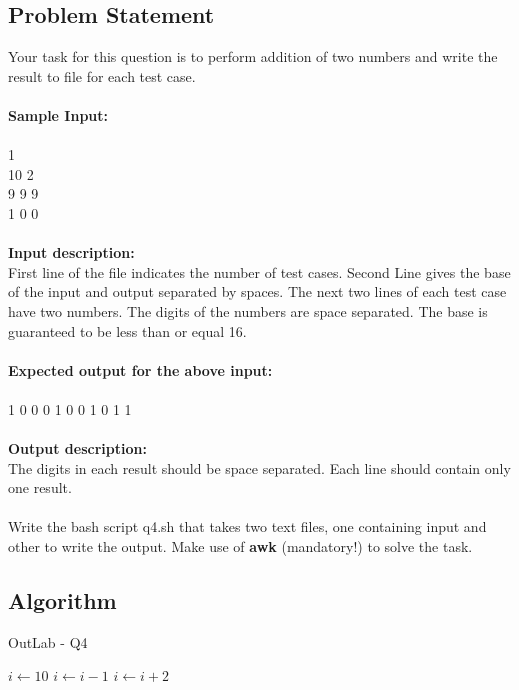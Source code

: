 \documentclass[12pt]{article}
\begin{document}
\subsection{Problem Statement}
Your task for this question is to perform addition of two numbers and 
write the result to file for each test case.\\\\
\textbf{Sample Input:}\\\\
1
\\
10 2
\\
9 9 9
\\
1 0 0
\\
\\
\textbf{Input description:}
\\
First line of the file indicates the number of test cases.
Second Line gives the base of the input and output separated by spaces. 
The next two lines of each test case have two numbers. 
The digits of the numbers are space separated. 
The base is guaranteed to be less than or equal 16.
\\\\
\textbf{Expected output for the above input:}
\\\\
1 0 0 0 1 0 0 1 0 1 1
\\\\
\textbf{Output description:}
\\
The digits in each result should be space separated. 
Each line should contain only one result.\\\\
Write the bash script q4.sh that takes two text files, one containing input and 
other to write the output. 
Make use of \textbf{awk} (mandatory!) to solve the task.
\newpage

\subsection{Algorithm}
\begin{algorithm*}
    \label{Q4}
    \caption{OutLab - Q4}\label{alg:Q4}
    $i\gets 10$\;
    {
        $i\gets i-1$\;
    }{
        {
            $i\gets i+2$\;
        }
    }
\end{algorithm*}
\newpage
\end{document}
